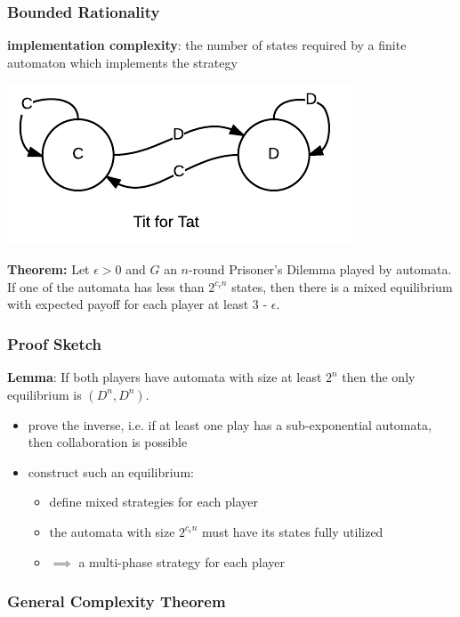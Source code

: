 \documentclass{beamer}
\begin{document}
\begin{frame}
	\frametitle{Bounded Rationality}
	\textbf{implementation complexity}: the number of states required by a finite automaton which implements the strategy	
	
	\includegraphics[scale=0.5]{tit4tat}
	
	
	\noindent \textbf{Theorem:} Let $\epsilon > 0$ and $G$ an $n$-round Prisoner's Dilemma played by automata. If one of the automata has less than $2^{c_\epsilon n}$ states, then there is a mixed equilibrium with expected payoff for each player at least 3 - $\epsilon$.
	
	
\end{frame}

\begin{frame}
	\frametitle{Proof Sketch}
	
	\textbf{Lemma}: If both players have automata with size at least $2^n$ then the only equilibrium is $(D^n, D^n)$.
	
	\begin{itemize}
		\item prove the inverse, i.e. if at least one play has a sub-exponential automata, then collaboration is possible
		\item construct such an equilibrium:
		\begin{itemize}
			\item define mixed strategies for each player
			\item the automata with size $2^{c_\epsilon n}$ must have its states fully utilized
			\item $\implies$ a multi-phase strategy for each player
		\end{itemize}
	\end{itemize}
	
\end{frame}

\begin{frame}
	\frametitle{General Complexity Theorem}
	
	
\end{frame}
\end{document}
